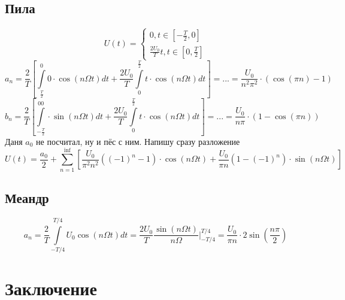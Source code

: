 \subsection{Пила}
\begin{equation}
	U(t)=\left\{
	\begin{aligned}
		0, t\in [-\frac{T}{2},0]\\
		\frac{2U_0}{T}t, t\in[0, \frac{T}{2}]
	\end{aligned}
	\right.
\end{equation}
\begin{equation}
	a_n=\frac{2}{T}\left[\int\limits_{\frac{T}{2}}^0 0\cdot\cos{(n\Omega t)} dt+\frac{2U_0}{T}\int\limits_0^{\frac{T}{2}}t\cdot\cos(n\Omega t)dt \right]=...=\frac{U_0}{n^2\pi^2}\cdot(\cos(\pi n)-1)
\end{equation}
\begin{equation}
	b_n=\frac{2}{T}\left[\int\limits_{-\frac{T}{2}}^00\cdot\sin(n\Omega t)dt + \frac{2U_0}{T}\int\limits_0^{\frac{T}{2}}t\cdot\cos(n\Omega t)dt\right]=...=\frac{U_0}{n\pi}\cdot(1-\cos(\pi n))
\end{equation}
Даня $a_0$ не посчитал, ну и пёс с ним. Напишу сразу разложение
\begin{equation}
	U(t)=\frac{a_0}{2}+\sum_{n=1}^{\inf}\left[\frac{U_0}{\pi^2n^2}\left((-1)^n-1\right)\cdot\cos(n\Omega t)+ \frac{U_0}{\pi n}(1-(-1)^n)\cdot\sin(n\Omega t)\right]
\end{equation}
\subsection{Меандр}
\begin{equation}
	a_n=\frac{2}{T}\int\limits_{-T/4}^{T/4} U_0\cos(n\Omega t)dt=\frac{2U_0}{T}\frac{\sin(n\Omega t)}{n\Omega}\bigg|^{T/4}_{-T/4}=\frac{U_0}{\pi n}\cdot2\sin(\frac{n\pi}{2})
\end{equation}


\newpage
\section{Заключение}

